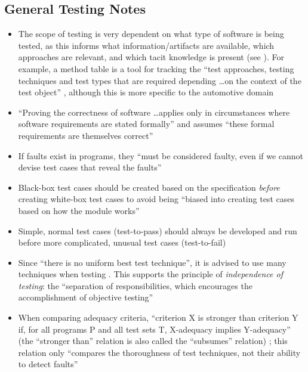 \subsection{General Testing Notes}

\begin{itemize}
      \item The scope of testing is very dependent on what type of software
            is being tested, as this informs what information/artifacts are
            available, which approaches are relevant, and which tacit knowledge
            is present (see ). For example, a method table
            is a tool for tracking the ``test approaches, testing techniques
            and test types that are required depending \dots on the context of
            the test object''  , although
            this is more specific to the automotive domain
      \item ``Proving the correctness of software \dots applies only in
            circumstances where software requirements are stated formally'' and
            assumes ``these formal requirements are themselves correct''
            \citep[p.~398]{vanVliet2000}
      \item If faults exist in programs, they ``must be considered faulty, even
            if we cannot devise test cases that reveal the faults''
            \citep[p.~401]{vanVliet2000}
      \item Black-box test cases should be created based on the specification
            \emph{before} creating white-box test cases to avoid being ``biased
            into creating test cases based on how the module works''
            \citep[p.~113]{Patton2006}
      \item Simple, normal test cases (test-to-pass) should always be developed
            and run before more complicated, unusual test cases (test-to-fail)
            \citep[p.~66]{Patton2006}
      \item Since ``there is no uniform best test technique'', it is advised to
            use many techniques when testing \citep[p.~440]{vanVliet2000}.
            This supports the principle of \emph{independence of testing}: the
            ``separation of responsibilities, which encourages the
            accomplishment of objective testing'' 
      \item When comparing adequacy criteria, ``criterion X is stronger than
            criterion Y if, for all programs P and all test sets T, X-adequacy
            implies Y-adequacy'' (the ``stronger than'' relation is also called
            the ``subsumes'' relation) \citep[p.~432]{vanVliet2000};
            this relation only ``compares the thoroughness of test techniques,
            not their ability to detect faults'' \citep[p.~434]{vanVliet2000}
\end{itemize}

